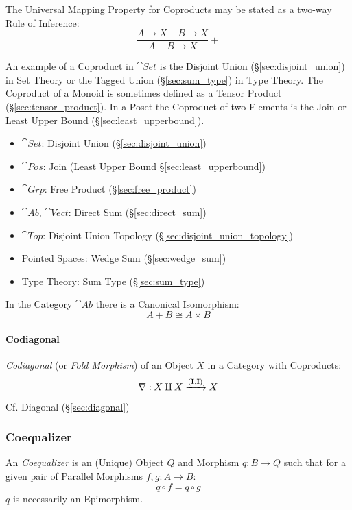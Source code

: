 The Universal Mapping Property for Coproducts may be stated as a
two-way Rule of Inference:
\[
  {
    \frac{A \rightarrow X \;\;\;\; B \rightarrow X}
    {A + B \rightarrow X}
  }+
\]

An example of a Coproduct in $\cat{Set}$ is the Disjoint Union
(\S\ref{sec:disjoint_union}) in Set Theory or the Tagged Union
(\S\ref{sec:sum_type}) in Type Theory. The Coproduct of a Monoid is
sometimes defined as a Tensor Product (\S\ref{sec:tensor_product}). In
a Poset the Coproduct of two Elements is the Join or Least Upper Bound
(\S\ref{sec:least_upperbound}).

\begin{itemize}
\item $\cat{Set}$: Disjoint Union (\S\ref{sec:disjoint_union})
\item $\cat{Pos}$: Join (Least Upper Bound
  \S\ref{sec:least_upperbound})
\item $\cat{Grp}$: Free Product (\S\ref{sec:free_product})
\item $\cat{Ab}$, $\cat{Vect}$: Direct Sum (\S\ref{sec:direct_sum})
\item $\cat{Top}$: Disjoint Union Topology
  (\S\ref{sec:disjoint_union_topology})
\item Pointed Spaces: Wedge Sum (\S\ref{sec:wedge_sum})
\item Type Theory: Sum Type (\S\ref{sec:sum_type})
\end{itemize}

In the Category $\cat{Ab}$ there is a Canonical
Isomorphism:\cite{awodey06}
\[
  A + B \cong A \times B
\]



\paragraph{Codiagonal}\label{sec:codiagonal}\hfill

\emph{Codiagonal} (or \emph{Fold Morphism}) of an Object $X$ in a
Category with Coproducts:
\[
  \nabla : X \amalg X \xrightarrow{(\mathbf{I},\mathbf{I})} X
\]

\fist Cf. Diagonal (\S\ref{sec:diagonal})



\subsubsection{Coequalizer}\label{sec:coequalizer}

An \emph{Coequalizer} is an (Unique) Object $Q$ and Morphism $q: B
\rightarrow Q$ such that for a given pair of Parallel Morphisms $f,g :
A \rightarrow B$:
\[
  q \circ f = q \circ g
\]
$q$ is necessarily an Epimorphism.

